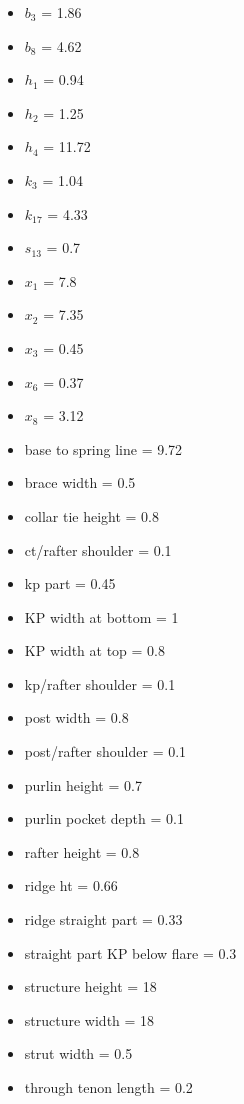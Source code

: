 \documentclass{article}\usepackage[]{graphicx}\usepackage[]{xcolor}
\begin{document}
\begin{multicols}{2}
\begin{itemize}
  \item $b_3$ = 1.86
  \item $b_8$ = 4.62
  \item $h_1$ = 0.94
  \item $h_2$ = 1.25
  \item $h_4$ = 11.72
  \item $k_3$ = 1.04
  \item $k_{17}$ = 4.33
  \item $s_{13}$ = 0.7
  \item $x_1$ = 7.8
  \item $x_2$ = 7.35
  \item $x_3$ = 0.45
  \item $x_6$ = 0.37
  \item $x_8$ = 3.12
  \item base to spring line = 9.72
  \item brace width = 0.5
  \item collar tie height = 0.8
  \item ct/rafter shoulder = 0.1
  \item kp part = 0.45
  \item KP width at bottom = 1
  \item KP width at top = 0.8
  \item kp/rafter shoulder = 0.1
  \item post width = 0.8
  \item post/rafter shoulder = 0.1
  \item purlin height = 0.7
  \item purlin pocket depth = 0.1
  \item rafter height = 0.8
  \item ridge ht = 0.66
  \item ridge straight part = 0.33
  \item straight part KP below flare = 0.3
  \item structure height = 18
  \item structure width = 18
  \item strut width = 0.5
  \item through tenon length = 0.2
\end{itemize}
\end{multicols}

\newpage
\end{document}
